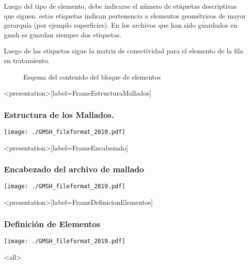 Luego del tipo de elemento, debe indicarse el número de 
etiquetas descriptivas que siguen. estas etiquetas indican
pertenencia  a elementos geométricos de mayor gerarquía 
(por ejemplo superficies). En los archivos
que han sido guardados en gmsh se guardan siempre dos 
etiquetas. 

Luego de las etiquetas sigue la matriz de conectividad para 
el elemento de la fila en tratamiento.

\begin{figure}
  \caption{Esqema del contenido del bloque de elementos
  \label{FiguraDefinicionElementos} }
  
\end{figure}

\mode*

\begin{frame}<presentation>[label=FrameEstructuraMallados]
  \frametitle{Estructura de los Mallados.}

  \texttt{[image: ./GMSH\_fileformat\_2019.pdf]}

\end{frame}

\begin{frame}<presentation>[label=FrameEncabezado]
  \frametitle{Encabezado del archivo de mallado}

  \texttt{[image: ./GMSH\_fileformat\_2019.pdf]}

\end{frame}

\begin{frame}<presentation>[label=FrameDefinicionElementos]
  \frametitle{Definición de Elementos}
  \texttt{[image: ./GMSH\_fileformat\_2019.pdf]}

\end{frame}
\mode<all>
